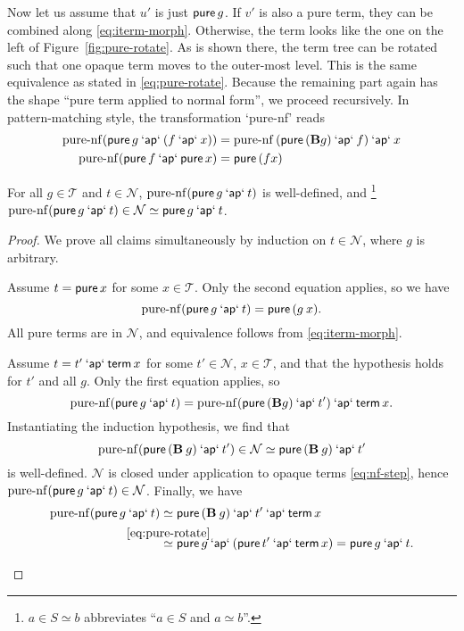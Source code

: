 Now let us assume that $u'$ is just $\operatorname{\mathsf{pure}} g$.
If $v'$ is also a pure term, they can be combined along \eqref{eq:iterm-morph}.
Otherwise, the term looks like the one on the left of Figure~\ref{fig:pure-rotate}.
As is shown there, the term tree can be rotated such that one opaque term moves
to the outer-most level.
This is the same equivalence as stated in \eqref{eq:pure-rotate}.
Because the remaining part again has the shape ``pure term applied to normal
form'', we proceed recursively.
In pattern-matching style, the transformation `pure-nf' reads
\begin{align}
	\operatorname{pure-nf}(\operatorname{\mathsf{pure}} g \mathbin{\mathsf{`ap`}} (f \mathbin{\mathsf{`ap`}} x)) &=
		\operatorname{pure-nf}{(\operatorname{\mathsf{pure}}{(\mathbf{B} g)} \mathbin{\mathsf{`ap`}} f)} \mathbin{\mathsf{`ap`}} x \\
	\operatorname{pure-nf}(\operatorname{\mathsf{pure}} f \mathbin{\mathsf{`ap`}} \operatorname{\mathsf{pure}} x) &= \operatorname{\mathsf{pure}}{(f x)}
\end{align}
\begin{lemma}\label{thm:pure-nf}
For all $g \in \mathcal{T}$ and $t \in \mathcal{N}$,
$\operatorname{pure-nf}(\operatorname{\mathsf{pure}} g \mathbin{\mathsf{`ap`}} t)$ is well-defined, and%
\/\footnote{$a \in S \simeq b$ abbreviates ``$a \in S$ and $a \simeq b$''.}
$\operatorname{pure-nf}(\operatorname{\mathsf{pure}} g \mathbin{\mathsf{`ap`}} t) \in \mathcal{N} \simeq \operatorname{\mathsf{pure}} g \mathbin{\mathsf{`ap`}} t$.
\end{lemma}
\begin{proof}
We prove all claims simultaneously by induction on $t \in \mathcal{N}$,
where $g$ is arbitrary.
\begin{prfcases}
\item Assume $t = \operatorname{\mathsf{pure}} x$ for some $x \in \mathcal{T}$.
	Only the second equation applies, so we have
	\[ \operatorname{pure-nf}(\operatorname{\mathsf{pure}} g \mathbin{\mathsf{`ap`}} t) = \operatorname{\mathsf{pure}}{(g \> x)}. \]
	All pure terms are in $\mathcal{N}$, and equivalence follows from
	\eqref{eq:iterm-morph}.
\item Assume $t = t' \mathbin{\mathsf{`ap`}} \operatorname{\mathsf{term}} x$ for some
	$t' \in \mathcal{N}$, $x \in \mathcal{T}$, and that the hypothesis holds
	for $t'$ and all $g$.
	Only the first equation applies, so
	\[ \operatorname{pure-nf}(\operatorname{\mathsf{pure}} g \mathbin{\mathsf{`ap`}} t) =
		\operatorname{pure-nf}(\operatorname{\mathsf{pure}}{(\mathbf{B} g)} \mathbin{\mathsf{`ap`}} t') \mathbin{\mathsf{`ap`}} \operatorname{\mathsf{term}} x. \]
	Instantiating the induction hypothesis, we find that
	\[ \operatorname{pure-nf}(\operatorname{\mathsf{pure}}{(\mathbf{B} \> g)} \mathbin{\mathsf{`ap`}} t') \in \mathcal{N} \simeq
		\operatorname{\mathsf{pure}}{(\mathbf{B} \> g)} \mathbin{\mathsf{`ap`}} t' \]
	is well-defined.
	$\mathcal{N}$ is closed under application to opaque terms \eqref{eq:nf-step},
	hence $\operatorname{pure-nf}(\operatorname{\mathsf{pure}} g \mathbin{\mathsf{`ap`}} t) \in \mathcal{N}$.
	Finally, we have
	\begin{align*}
		\operatorname{pure-nf}(\spure g \sap t) &\simeq
			\spure{(\mathbf{B} \sapp g)} \sap t' \sap \sterm x \\
		&\stackrel{\mathclap{\eqref{eq:pure-rotate}}}{\simeq}
			\spure g \sap (\spure t' \sap \sterm x) =
			\spure g \sap t. \qedhere
	\end{align*}
\end{prfcases}
\end{proof}

